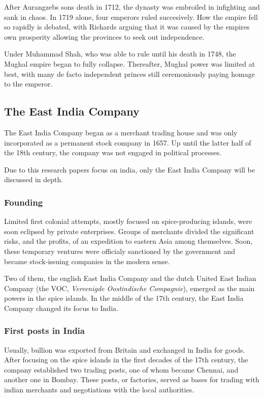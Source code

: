 \documentclass[11pt, a4paper, headings=standardclasses]{scrartcl}
\begin{document}
After Aurangzebs sons death in 1712, the dynasty was embroiled in infighting and sank in chaos. In 1719 alone, four emperors ruled succesively.\autocite[Chapter 12]{richards} How the empire fell so rapidly is debated, with Richards arguing that it was caused by the empires own prosperity allowing the provinces to seek out independence.\autocite{MughalFinances}

Under Muhammad Shah, who was able to rule until his death in 1748, the Mughal empire began to fully collapse. Thereafter, Mughal power was limited at best, with many de facto independent princes still ceremoniously paying homage to the emperor.\autocite{bose}

\subsection{The East India Company}

The East India Company began as a merchant trading house and was only incorporated as a permanent stock company in 1657.\autocite{EIC2} Up until the latter half of the 18th century, the company was not engaged in political processes.

Due to this research papers focus on india, only the East India Company will be discussed in depth.

\subsubsection{Founding}

Limited first colonial attempts, mostly focused on spice-producing islands, were soon eclipsed by private enterprises. Groups of merchants divided the significant risks, and the profits, of an expedition to eastern Asia among themselves. Soon, these temporary ventures were officialy sanctioned by the government and became stock-issuing companies in the modern sense.

Two of them, the english East India Company and the dutch United East Indian Company (the VOC, \textit{Vereenigde Oostindische Compagnie}), emerged as the main powers in the spice islands.\autocite{VOC} In the middle of the 17th century, the East India Company changed its focus to India.\autocite[Part I]{EIC}

\subsubsection{First posts in India}

Usually, bullion was exported from Britain and exchanged in India for goods.\autocite[Section \textit{The commodity structure of trade}]{FT} After focusing on the spice islands in the first decades of the 17th century, the company established two trading posts, one of whom became Chennai, and another one in Bombay. These posts, or factories, served as bases for trading with indian merchants and negotiations with the local authorities.\autocite{EIC}
\end{document}
